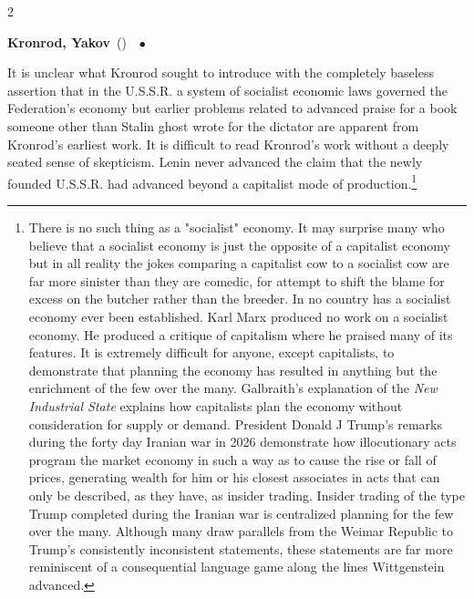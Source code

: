 \documentclass[10pt,a4paper,twoside]{article} %
\newcommand{\entry}[4]{\markboth{#1}{#1}\textbf{#1}\ {(#2)}\ \textit{#3}\ $\bullet$\ {#4}}  %
\begin{document}
\begin{multicols}{2}
\entry{Kronrod, Yakov} {} {} {It is unclear what Kronrod sought to introduce with the completely baseless assertion that in the U.S.S.R. a system of socialist economic laws governed the Federation’s economy but earlier problems related to advanced praise for a book someone other than Stalin ghost wrote for the dictator are apparent from Kronrod’s earliest work. It is difficult to read Kronrod’s work without a deeply seated sense of skepticism. Lenin never advanced the claim that the newly founded U.S.S.R. had advanced beyond a capitalist mode of production.\footnote{There is no such thing as a "socialist" economy. It may surprise many who believe that a socialist economy is just the opposite of a capitalist economy but in all reality the jokes comparing a capitalist cow to a socialist cow are far more sinister than they are comedic, for attempt to shift the blame for excess on the butcher rather than the breeder. In no country has a socialist economy ever been established. Karl Marx produced no work on a socialist economy. He produced a critique of capitalism where he praised many of its features. It is extremely difficult for anyone, except capitalists, to demonstrate that planning the economy has resulted in anything but the enrichment of the few over the many. Galbraith's explanation of the \emph{New Industrial State} explains how capitalists plan the economy without consideration for supply or demand. President Donald J Trump's remarks during the forty day Iranian war in 2026 demonstrate how illocutionary acts program the market economy in such a way as to cause the rise or fall of prices, generating wealth for him or his closest associates in acts that can only be described, as they have, as insider trading. Insider trading of the type Trump completed during the Iranian war is centralized planning for the few over the many. Although many draw parallels from the Weimar Republic to Trump's consistently inconsistent statements, these statements are far more reminiscent of a consequential language game along the lines Wittgenstein advanced.}

}
\end{multicols}
\end{document}
